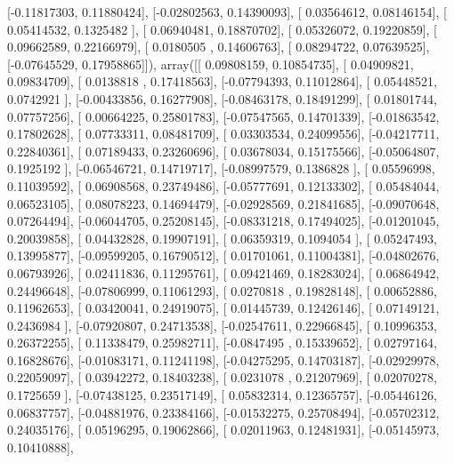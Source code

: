 \documentclass{article}
\begin{document}
       [-0.11817303,  0.11880424],
       [-0.02802563,  0.14390093],
       [ 0.03564612,  0.08146154],
       [ 0.05414532,  0.1325482 ],
       [ 0.06940481,  0.18870702],
       [ 0.05326072,  0.19220859],
       [ 0.09662589,  0.22166979],
       [ 0.0180505 ,  0.14606763],
       [ 0.08294722,  0.07639525],
       [-0.07645529,  0.17958865]]), array([[ 0.09808159,  0.10854735],
       [ 0.04909821,  0.09834709],
       [ 0.0138818 ,  0.17418563],
       [-0.07794393,  0.11012864],
       [ 0.05448521,  0.0742921 ],
       [-0.00433856,  0.16277908],
       [-0.08463178,  0.18491299],
       [ 0.01801744,  0.07757256],
       [ 0.00664225,  0.25801783],
       [-0.07547565,  0.14701339],
       [-0.01863542,  0.17802628],
       [ 0.07733311,  0.08481709],
       [ 0.03303534,  0.24099556],
       [-0.04217711,  0.22840361],
       [ 0.07189433,  0.23260696],
       [ 0.03678034,  0.15175566],
       [-0.05064807,  0.1925192 ],
       [-0.06546721,  0.14719717],
       [-0.08997579,  0.1386828 ],
       [ 0.05596998,  0.11039592],
       [ 0.06908568,  0.23749486],
       [-0.05777691,  0.12133302],
       [ 0.05484044,  0.06523105],
       [ 0.08078223,  0.14694479],
       [-0.02928569,  0.21841685],
       [-0.09070648,  0.07264494],
       [-0.06044705,  0.25208145],
       [-0.08331218,  0.17494025],
       [-0.01201045,  0.20039858],
       [ 0.04432828,  0.19907191],
       [ 0.06359319,  0.1094054 ],
       [ 0.05247493,  0.13995877],
       [-0.09599205,  0.16790512],
       [ 0.01701061,  0.11004381],
       [-0.04802676,  0.06793926],
       [ 0.02411836,  0.11295761],
       [ 0.09421469,  0.18283024],
       [ 0.06864942,  0.24496648],
       [-0.07806999,  0.11061293],
       [ 0.0270818 ,  0.19828148],
       [ 0.00652886,  0.11962653],
       [ 0.03420041,  0.24919075],
       [ 0.01445739,  0.12426146],
       [ 0.07149121,  0.2436984 ],
       [-0.07920807,  0.24713538],
       [-0.02547611,  0.22966845],
       [ 0.10996353,  0.26372255],
       [ 0.11338479,  0.25982711],
       [-0.0847495 ,  0.15339652],
       [ 0.02797164,  0.16828676],
       [-0.01083171,  0.11241198],
       [-0.04275295,  0.14703187],
       [-0.02929978,  0.22059097],
       [ 0.03942272,  0.18403238],
       [ 0.0231078 ,  0.21207969],
       [ 0.02070278,  0.1725659 ],
       [-0.07438125,  0.23517149],
       [ 0.05832314,  0.12365757],
       [-0.05446126,  0.06837757],
       [-0.04881976,  0.23384166],
       [-0.01532275,  0.25708494],
       [-0.05702312,  0.24035176],
       [ 0.05196295,  0.19062866],
       [ 0.02011963,  0.12481931],
       [-0.05145973,  0.10410888],
\end{document}
